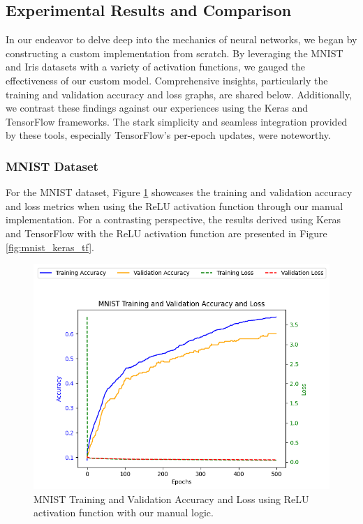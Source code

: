 \documentclass[letterpaper]{article}
\begin{document}
\subsection{Experimental Results and Comparison}
\label{subsec:experimentalresults}
In our endeavor to delve deep into the mechanics of neural networks, we began by constructing a custom implementation from scratch. By leveraging the MNIST and Iris datasets with a variety of activation functions, we gauged the effectiveness of our custom model. Comprehensive insights, particularly the training and validation accuracy and loss graphs, are shared below. Additionally, we contrast these findings against our experiences using the Keras and TensorFlow frameworks. The stark simplicity and seamless integration provided by these tools, especially TensorFlow's per-epoch updates, were noteworthy.

\subsubsection{MNIST Dataset}
For the MNIST dataset, Figure \ref{fig:mnist_graph} showcases the training and validation accuracy and loss metrics when using the ReLU activation function through our manual implementation. For a contrasting perspective, the results derived using Keras and TensorFlow with the ReLU activation function are presented in Figure \ref{fig:mnist_keras_tf}.

\begin{figure}[h]
    \centering
    \includegraphics[width=0.8\linewidth]{mnist_relu_custom.png} %
    \caption{MNIST Training and Validation Accuracy and Loss using ReLU activation function with our manual logic.}
    \label{fig:mnist_graph}
\end{figure}
\end{document}
